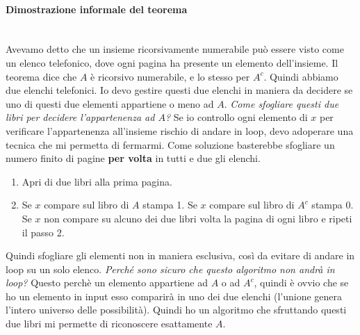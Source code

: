 \documentclass{article}
\begin{document}
\paragraph{Dimostrazione informale del teorema}\mbox{}\\
Avevamo detto che un insieme ricorsivamente numerabile può essere visto come
un elenco telefonico, dove ogni pagina ha presente un elemento dell'insieme.
Il teorema dice che $A$ è ricorsivo numerabile, e lo stesso per $A^c$. Quindi abbiamo
due elenchi telefonici. Io devo gestire questi due elenchi in maniera da decidere
se uno di questi due elementi appartiene o meno ad $A$. \textit{Come sfogliare
questi due libri per decidere l'appartenenza ad $A$?} Se io controllo ogni elemento
di $x$ per verificare l'appartenenza all'insieme rischio di andare in loop, devo
adoperare una tecnica che mi permetta di fermarmi. Come soluzione basterebbe sfogliare
un numero finito di pagine \textbf{per volta} in tutti e due gli elenchi.
\begin{enumerate}
    \item Apri di due libri alla prima pagina.
    \item Se $x$ compare sul libro di $A$ stampa 1. Se $x$ compare sul libro di $A^c$
    stampa 0. Se $x$ non compare su alcuno dei due libri volta la pagina di ogni libro
    e ripeti il passo 2.
\end{enumerate}
Quindi sfogliare gli elementi non in maniera esclusiva, così da evitare di andare
in loop su un solo elenco. \textit{Perché sono sicuro che questo algoritmo non
andrà in loop?} Questo perchè un elemento appartiene ad $A$ o ad $A^c$, quindi
è ovvio che se ho un elemento in input esso comparirà in uno dei due elenchi (l'unione
genera l'intero universo delle possibilità).
Quindi ho un algoritmo che sfruttando questi due libri mi permette di riconoscere
esattamente $A$.
\end{document}
